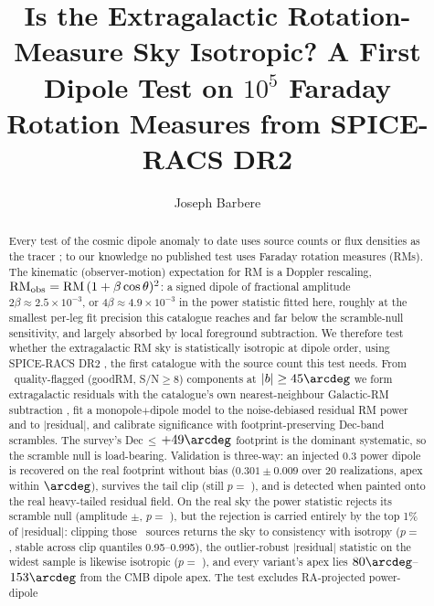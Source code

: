\documentclass[twocolumn]{aastex631}
\begin{document}
\title{Is the Extragalactic Rotation-Measure Sky Isotropic? A First Dipole Test
on $10^5$ Faraday Rotation Measures from SPICE-RACS DR2}
\author[0009-0008-3289-4447]{Joseph Barbere}

\begin{abstract}
Every test of the cosmic dipole anomaly to date uses source counts or flux densities as the
tracer \citep{secrest2025,boehme2025,landstrykowski2025,mittal2026}; to our knowledge no published test uses Faraday
rotation measures (RMs). The kinematic (observer-motion) expectation for RM is a Doppler rescaling,
$\mathrm{RM}_{\rm obs} = \mathrm{RM}\,(1+\beta\cos\theta)^2$: a signed dipole of fractional
amplitude $2\beta \approx 2.5\times10^{-3}$, or $4\beta \approx 4.9\times10^{-3}$ in the
power statistic fitted here, roughly at the smallest per-leg fit precision this catalogue
reaches and far below the scramble-null sensitivity, and largely absorbed by local foreground
subtraction. We therefore test whether the
extragalactic RM sky is statistically isotropic at dipole order, using SPICE-RACS DR2
\citep{spiceracs_dr2}, the first catalogue with the source count this test needs. From \rmdRealN\
quality-flagged (goodRM, S/N$\ge$8) components at
$|b|\ge45\arcdeg$ we form extragalactic residuals with the catalogue's own nearest-neighbour
Galactic-RM subtraction \citep[the convention of][]{malik2026}, fit a monopole$+$dipole model to
the noise-debiased residual RM power and to $|$residual$|$, and calibrate significance with
footprint-preserving Dec-band scrambles. The survey's Dec$\,\le\,$$+49\arcdeg$ footprint is the
dominant systematic, so the scramble null is load-bearing. Validation is three-way: an injected 0.3 power
dipole is recovered on the real footprint without bias ($0.301\pm0.009$ over 20 realizations,
apex within \rmdRealInjSepTrue$\arcdeg$), survives the tail clip (still $p=$ \rmdRealInjClipP),
and is detected when painted onto the real heavy-tailed residual field. On the real sky the power statistic rejects its scramble null
(amplitude \rmdRealAmp$\pm$\rmdRealAmpSe, $p=$ \rmdRealPScramble), but the rejection is
carried entirely by the top 1\% of $|$residual$|$: clipping those \rmdRealClipN\ sources returns
the sky to consistency with isotropy ($p=$ \rmdRealClipP, stable across clip quantiles
0.95--0.995), the outlier-robust $|$residual$|$ statistic on the widest sample is likewise
isotropic ($p=$ \rmdRealWideAbsP), and every variant's apex lies $80\arcdeg$--$153\arcdeg$ from
the CMB dipole apex. The test excludes RA-projected power-dipole
$$
\end{abstract}
\end{document}
